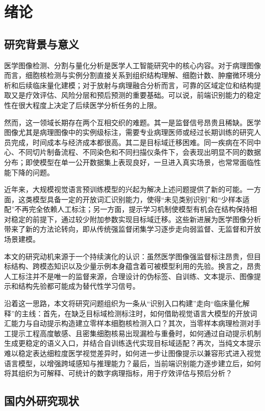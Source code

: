 \chapter{绪论}

\section{研究背景与意义}
医学图像检测、分割与量化分析是医学人工智能研究中的核心内容。对于病理图像而言，细胞核检测与实例分割直接关系到组织结构理解、细胞计数、肿瘤微环境分析和后续临床量化建模；对于放射与病理融合分析而言，可靠的区域定位和结构提取又是疗效评估、风险分层和预后预测的重要基础。可以说，前端识别能力的稳定性在很大程度上决定了后续医学分析任务的上限。

然而，这一领域长期存在两个互相交织的难题。其一是监督信号昂贵且稀缺。医学图像尤其是病理图像中的实例级标注，需要专业病理医师或经过长期训练的研究人员完成，时间成本与经济成本都很高。其二是目标域迁移困难。同一疾病在不同中心、不同切片制备流程、不同染色和不同扫描仪条件下，会表现出明显不同的数据分布；即使模型在单一公开数据集上表现良好，一旦进入真实场景，也常常面临性能下降的问题。

近年来，大规模视觉语言预训练模型的兴起为解决上述问题提供了新的可能。一方面，这类模型具备一定的开放词汇识别能力，使得“未见类别识别”和“少样本适配”不再完全依赖人工标注；另一方面，提示学习机制使模型有机会在结构保持相对稳定的前提下，通过较少附加参数实现目标域迁移。这些新进展为医学图像分析带来了新的方法论转向，即从传统强监督闭集学习逐步走向弱监督、无监督和开放场景建模。

本文的研究动机来源于一个持续演化的认识：虽然医学图像强监督标注昂贵，但目标结构、跨模态知识以及少量示例本身蕴含着可被模型利用的先验。换言之，昂贵人工标注并不是唯一的监督来源，合理设计的伪标签、自训练、文本提示、图像提示和结构先验都可能成为替代性学习信号。

沿着这一思路，本文将研究问题组织为一条从“识别入口构建”走向“临床量化解释”的主线：首先，在缺乏目标域检测标注时，如何借助视觉语言大模型的开放词汇能力与自动提示构造建立零样本细胞核检测入口？其次，当零样本病理检测对手工提示工程高度敏感、且密集细胞核易出现漏检与重叠时，如何通过自动提示机制生成更稳定的语义入口，并结合自训练迭代实现目标域适配？再次，当纯文本提示难以稳定表达细粒度医学视觉差异时，如何进一步让图像提示以兼容形式进入视觉语言模型，以增强跨域感知与推理能力？最后，当前端识别能力逐步建立后，如何将其组织为可解释、可统计的数字病理指标，用于疗效评估与预后分析？

\section{国内外研究现状}
